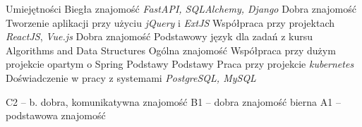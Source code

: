 \begin{rubric}{Umiejętności}
\entry*[Python]
	Biegła znajomość\newline
    \textit{FastAPI, SQLAlchemy, Django}
\entry*[JavaScript]
	Dobra znajomość\newline
    Tworzenie aplikacji przy użyciu \textit{jQuery} i \textit{ExtJS}
    Współpraca przy projektach \textit{ReactJS}, \textit{Vue.js}
\entry*[C++]
    Dobra znajomość\newline
    Podstawowy język dla zadań z kursu Algorithms and Data Structures
\entry*[Java]
    Ogólna znajomość\newline
    Współpraca przy dużym projekcie opartym o Spring
\entry*[Scala]
    Podstawy
\entry*[Go]
    Podstawy\newline
    Praca przy projekcie \textit{kubernetes}
    Doświadczenie w pracy z systemami \textit{PostgreSQL, MySQL}

\entry*[Angielski]
    C2 -- b. dobra, komunikatywna znajomość
\entry*[Rosyjski]
    B1 -- dobra znajomość bierna
\entry*[Hiszpański]
    A1 -- podstawowa znajomość
\end{rubric}
